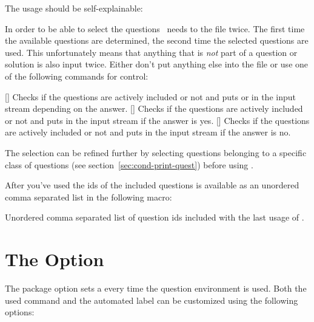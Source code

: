 \documentclass[load-preamble+]{cnltx-doc}
\begin{document}
The usage should be self-explainable:
\begin{sourcecode}
\end{sourcecode}
In order to be able to select the questions \ExSheets\ needs to 
the file twice.  The first time the available questions are determined, the
second time the selected questions are used.  This unfortunately means that
anything that is \emph{not} part of a question or solution is also input
twice.  Either don't put anything else into the file or use one of the
following commands for control:
\begin{commands}
  []
    Checks if the questions are actively included or not and puts  or  in the input stream depending on the answer.
  []
    Checks if the questions are actively included or not and puts  in the input stream if the answer is yes.
  []
    Checks if the questions are actively included or not and puts  in the input stream if the answer is no.
\end{commands}

The selection can be refined further by selecting questions belonging to a
specific class of questions (see section~\ref{sec:cond-print-quest}) before
using .

After you've used  the \acp{id} of the
included questions is available as an unordered comma separated list in the
following macro:
\begin{commands}
    Unordered comma separated list of question \acp{id} included with the last
    usage of .
\end{commands}

\section{The  Option}\label{sec:auto-label-opti}
The package option  sets a
 every time the question environment is used.
Both the used command and the automated label can be customized using the
following options:
\end{document}
